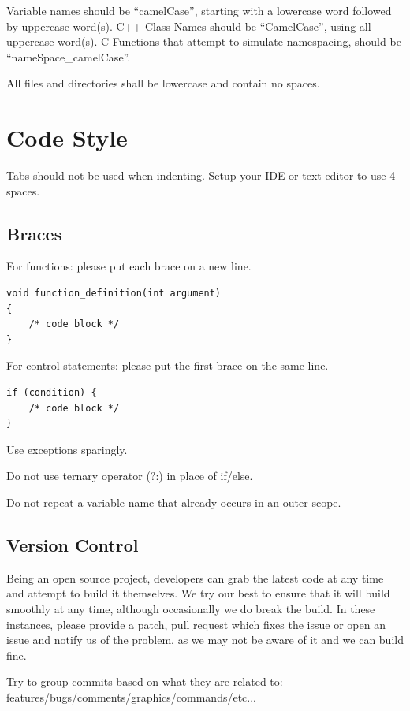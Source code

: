 \documentclass[a4paper, 11pt]{report}
\begin{document}
Variable names should be ``camelCase'', starting with a lowercase word followed by uppercase word(s).
C++ Class Names should be ``CamelCase'', using all uppercase word(s).
C Functions that attempt to simulate namespacing, should be ``nameSpace\_camelCase''.

All files and directories shall be lowercase and contain no spaces.

\section{Code Style}

Tabs should not be used when indenting. Setup your IDE or text editor to use 4 spaces.

\subsection{Braces}

For functions: please put each brace on a new line.

\begin{lstlisting}
void function_definition(int argument)
{
    /* code block */
}
\end{lstlisting}

For control statements: please put the first brace on the same line.

\begin{lstlisting}
if (condition) {
    /* code block */    
}
\end{lstlisting}

Use exceptions sparingly.

Do not use ternary operator (?:) in place of if/else.

Do not repeat a variable name that already occurs in an outer scope.

\subsection{Version Control}

Being an open source project, developers can grab the latest code at any time
and attempt to build it themselves. We try our best to ensure that it will build smoothly
at any time, although occasionally we do break the build. In these instances,
please provide a patch, pull request which fixes the issue or open an issue and
notify us of the problem, as we may not be aware of it and we can build fine.

Try to group commits based on what they are related to: features/bugs/comments/graphics/commands/etc...
\end{document}
